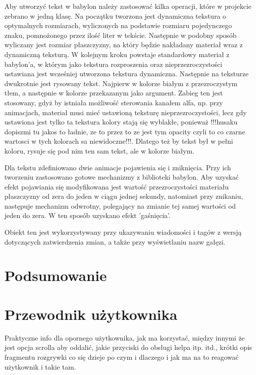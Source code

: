 \documentclass[11pt,a4paper,polish,thesis]{dcsbook}
\begin{document}
Aby utworzyć tekst w babylon należy zastosować kilka operacji, które w projekcie zebrano w jedną klasę. Na początku tworzona jest dynamiczna tekstura o optymalnych rozmiarach, wyliczonych na podstawie rozmiaru pojedynczego znaku, pomnożonego przez ilość liter w tekście. Następnie w podobny sposób wyliczany jest rozmiar płaszczyzny, na który będzie nakładany materiał wraz z dynamiczną teksturą. W kolejnym kroku powstaje standardowy materiał z babylon'a, w którym jako tekstura rozproszenia oraz nieprzezroczystości ustawiana jest wcześniej utworzona tekstura dynamiczna. Następnie na teksturze dwukrotnie jest rysowany tekst. Najpierw w kolorze białym z przezroczystym tłem, a następnie w kolorze przekazanym jako argument. Zabieg ten jest stosowany, gdyż by istniała możliwość sterowania kanałem alfa, np. przy animacjach, materiał musi mieć ustawioną teksturę nieprzezroczystości, lecz gdy ustawiona jest tylko ta tekstura kolory stają się wyblakłe, ponieważ !!!husaku dopiszmi tu jakos to ładnie, ze to przez to ze jest tym opacity czyli to co czarne wartosci w tych kolorach sa niewidoczne!!!.
Dlatego też by tekst był w pełni koloru, rysuje się pod nim ten sam tekst, ale w kolorze białym.
	
	Dla tekstu zdefiniowano dwie animacje pojawienia się i zniknięcia. Przy ich tworzeniu zastosowano gotowe mechanizmy z biblioteki babylon. Aby uzyskać efekt pojawiania się modyfikowana jest wartość przezroczystości materiału płaszczyzny od zera do jeden w ciągu jednej sekundy, natomiast przy znikaniu, następuje mechanizm odwrotny, polegający na zmianie tej samej wartości od jeden do zera. W ten sposób uzyskano efekt 'gaśnięcia'.
	
	Obiekt ten jest wykorzystywany przy ukazywaniu wiadomości i tagów z wersją dotyczących zatwierdzenia zmian, a także przy wyświetlaniu nazw gałęzi.

	
	
	
	\chapter{Podsumowanie}
	
	\appendix
	
	\chapter{Przewodnik użytkownika}
	
	Praktyczne info dla opornego użytkownika, jak ma korzystać, między innymi że jest opcja scrolla aby oddalić, jakie przyciski do obsługi helpa itp. itd., krótki opis fragmentu rozgrywki co się dzieje po czym i dlaczego i jak ma na to reagować użytkownik i takie tam.
	
	\backmatter
	
\end{document}
